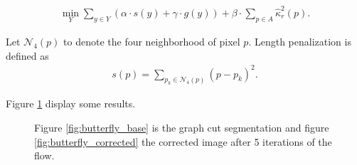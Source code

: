 \documentclass[runningheads]{llncs}
\begin{document}
\begin{align}			
	\min_{Y} \sum_{y \in Y}{\left( \alpha \cdot s(y) + \gamma \cdot g(y) \right)} + \beta \cdot \sum_{p \in A}{\hat{\kappa}_{r}^2(p)}.
	\label{eq:boundary-correction-energy}
\end{align}
	
	Let $\mathcal{N}_4(p)$ to denote the four neighborhood of pixel $p$. Length penalization is defined as
	\begin{align*}
		s(p)=\sum_{p_k \in \mathcal{N}_4(p)}{ (p-p_k) }^2.
	\end{align*}


Figure \ref{fig:butterfly_results} display some results.

	\begin{figure}[!ht]
		\center
		\hspace{15pt}
		\caption{Figure \ref{fig:butterfly_base} is the graph cut segmentation and figure \ref{fig:butterfly_corrected} the corrected image after 5 iterations of the flow.}
		\label{fig:butterfly_results}
	\end{figure}


%
%
%


\end{document}
